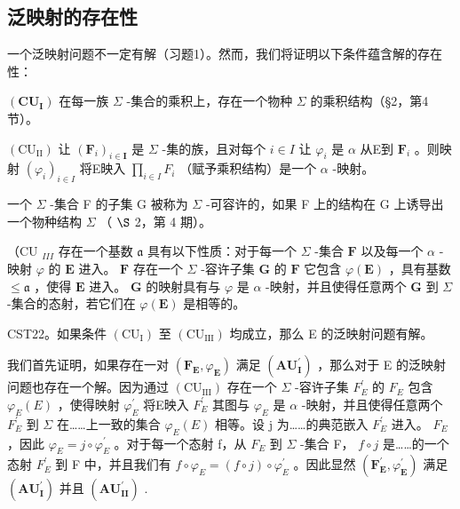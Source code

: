 \subsection{泛映射的存在性}

一个泛映射问题不一定有解（习题1）。然而，我们将证明以下条件蕴含解的存在性：

\((\mathbf{CU}_{\mathbf{I}})\) 在每一族 \(\Sigma\) -集合的乘积上，存在一个物种 \(\Sigma\) 的乘积结构（§2，第4节）。

\((\mathrm{CU}_{\mathrm{II}})\) 让 \((\mathbf{F}_i)_{i\in \mathbf{I}}\) 是 \(\Sigma\) -集的族，且对每个 \(i\in I\) 让 \(\varphi_i\) 是 \(\alpha\) 从E到 \(\mathbf{F}_i\) 。则映射 \((\varphi_i)_{i\in I}\) 将E映入 \(\prod_{i\in I}F_i\) （赋予乘积结构）是一个 \(\alpha\) -映射。

一个 \(\Sigma\) -集合 F 的子集 G 被称为 \(\Sigma\) -可容许的，如果 F 上的结构在 G 上诱导出一个物种结构 \(\Sigma\) （ \(\S\) 2，第 4 期）。

（CU \(_{III}\) 存在一个基数 \(\mathfrak{a}\) 具有以下性质：对于每一个 \(\Sigma\) -集合 \(\mathbf{F}\) 以及每一个 \(\alpha\) -映射 \(\varphi\) 的 \(\mathbf{E}\) 进入。 \(\mathbf{F}\) 存在一个 \(\Sigma\) -容许子集 \(\mathbf{G}\) 的 \(\mathbf{F}\) 它包含 \(\varphi(\mathbf{E})\) ，具有基数 \(\leqslant \mathfrak{a}\) ，使得 \(\mathbf{E}\) 进入。 \(\mathbf{G}\) 的映射具有与 \(\varphi\) 是 \(\alpha\) -映射，并且使得任意两个 \(\mathbf{G}\) 到 \(\Sigma\) -集合的态射，若它们在 \(\varphi(\mathbf{E})\) 是相等的。

CST22。如果条件 \((\mathrm{CU}_{\mathrm{I}})\) 至 \((\mathrm{CU}_{\mathrm{III}})\) 均成立，那么 E 的泛映射问题有解。

我们首先证明，如果存在一对 \((\mathbf{F}_{\mathbf{E}}, \varphi_{\mathbf{E}})\) 满足 \((\mathbf{AU}_{\mathbf{I}}^{\prime})\) ，那么对于 E 的泛映射问题也存在一个解。因为通过 \((\mathrm{CU}_{\mathrm{III}})\) 存在一个 \(\Sigma\) -容许子集 \(F_{E}^{\prime}\) 的 \(F_{E}\) 包含 \(\varphi_{E}(E)\) ，使得映射 \(\varphi_{E}^{\prime}\) 将E映入 \(F_{E}^{\prime}\) 其图与 \(\varphi_{E}\) 是 \(\alpha\) -映射，并且使得任意两个 \(F_{E}^{\prime}\) 到 \(\Sigma\) 在……上一致的集合 \(\varphi_{E}(E)\) 相等。设 j 为……的典范嵌入 \(F_{E}^{\prime}\) 进入。 \(F_{E}\) ，因此 \(\varphi_{E} = j \circ \varphi_{E}^{\prime}\) 。对于每一个态射 f，从 \(F_{E}\) 到 \(\Sigma\) -集合 F， \(f \circ j\) 是……的一个态射 \(F_{E}^{\prime}\) 到 F 中，并且我们有 \(f \circ \varphi_{E} = (f \circ j) \circ \varphi_{E}^{\prime}\) 。因此显然 \((\mathbf{F}_{\mathbf{E}}^{\prime}, \varphi_{\mathbf{E}}^{\prime})\) 满足 \((\mathbf{AU}_{\mathbf{I}}^{\prime})\) 并且 \((\mathbf{AU}_{\mathbf{II}}^{\prime})\) .

